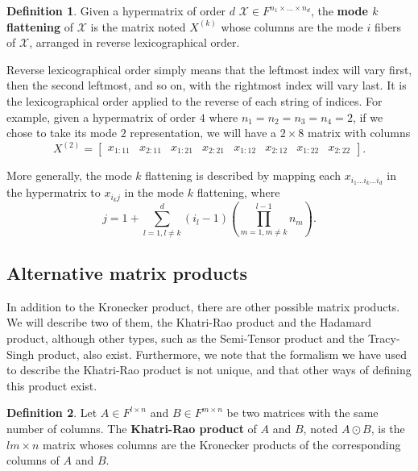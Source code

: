 \documentclass{report}
\theoremstyle{definition}
\newtheorem{defin}{Definition}
\theoremstyle{remark}
\begin{document}
\begin{defin}
Given a hypermatrix of order $d$ $\mathcal{X} \in F^{n_1 \times \dots \times n_d}$, the \textbf{mode $k$ flattening} of $\mathcal{X}$ is the matrix noted $X^{(k)}$ whose columns are the mode $i$ fibers of $\mathcal{X}$, arranged in reverse lexicographical order.
\end{defin}

Reverse lexicographical order simply means that the leftmost index will vary first, then the second leftmost, and so on, with the rightmost index will vary last. It is the lexicographical order applied to the reverse of each string of indices. For example, given a hypermatrix of order $4$ where $n_1 = n_2 = n_3 =n_4 = 2$, if we chose to take its mode $2$ representation, we will have a $2 \times 8$ matrix with columns 
\begin{equation*}
        X^{(2)} = \begin{bmatrix} x_{1:11} & x_{2:11} & x_{1:21} & x_{2:21} & x_{1:12} & x_{2:12} & x_{1:22} & x_{2:22} \end{bmatrix}.
\end{equation*}

More generally, the mode $k$ flattening is described by mapping each $x_{i_1 \dots i_k \dots i_d}$ in the hypermatrix to $x_{i_k j}$ in the mode $k$ flattening, where
\begin{equation*}
        j = 1 + \sum_{l = 1,l \neq k}^d (i_l -1)(\prod_{ m = 1,m \neq k}^{l-1} n_m).
\end{equation*}



\subsection{Alternative matrix products}
In addition to the Kronecker product, there are other possible matrix products. We will describe two of them, the Khatri-Rao product and the Hadamard product, although other types, such as the Semi-Tensor product and the Tracy-Singh product, also exist. Furthermore, we note that the formalism we have used to describe the Khatri-Rao product is not unique, and that other ways of defining this product exist.

\begin{defin}
        Let $A \in F^{l \times n}$ and $B \in F^{m \times n}$ be two matrices with the same number of columns. The \textbf{Khatri-Rao product} of $A$ and $B$, noted $A \odot B$, is the $lm \times n$ matrix whoses columns are the Kronecker products of the corresponding columns of $A$ and $B$.
\end{defin}
\end{document}
